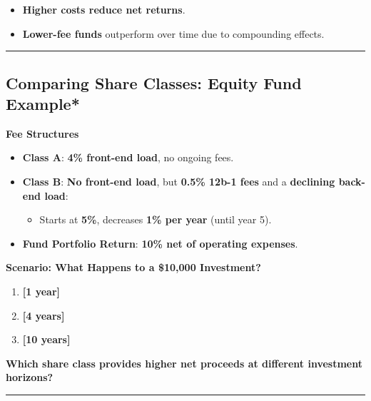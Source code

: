 \documentclass[
  letterpaper,
  DIV=11,
  numbers=noendperiod]{scrartcl}
\providecommand{\tightlist}{%
  \setlength{\itemsep}{0pt}\setlength{\parskip}{0pt}}\usepackage{longtable,booktabs,array}
\begin{document}
\begin{itemize}
\tightlist
\item
  \textbf{Higher costs reduce net returns}.
\item
  \textbf{Lower-fee funds} outperform over time due to compounding
  effects.
\end{itemize}

\begin{center}\rule{0.5\linewidth}{0.5pt}\end{center}

\subsection{Comparing Share Classes: Equity Fund
Example*}\label{comparing-share-classes-equity-fund-example}

\textbf{Fee Structures}

\begin{itemize}
\tightlist
\item
  \textbf{Class A}: \textbf{4\% front-end load}, no ongoing fees.
\item
  \textbf{Class B}: \textbf{No front-end load}, but \textbf{0.5\% 12b-1
  fees} and a \textbf{declining back-end load}:

  \begin{itemize}
  \tightlist
  \item
    Starts at \textbf{5\%}, decreases \textbf{1\% per year} (until year
    5).
  \end{itemize}
\item
  \textbf{Fund Portfolio Return}: \textbf{10\% net of operating
  expenses}.
\end{itemize}

\textbf{Scenario: What Happens to a \$10,000 Investment?}

\begin{enumerate}
\def\labelenumi{\arabic{enumi}.}
\tightlist
\item
  \textbf{{[}1 year{]}}
\item
  \textbf{{[}4 years{]}}
\item
  \textbf{{[}10 years{]}}
\end{enumerate}

\textbf{Which share class provides higher net proceeds at different
investment horizons?}

\begin{center}\rule{0.5\linewidth}{0.5pt}\end{center}
\end{document}
